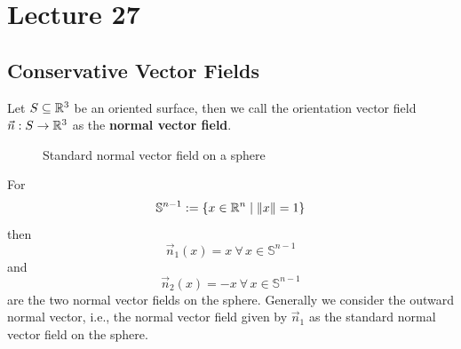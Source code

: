 \documentclass[../Analysis-3]{subfiles}
\begin{document}
\chapter*{Lecture 27} %
\setcounter{chapter}{27} %
\setcounter{section}{0}

\section{Conservative Vector Fields}

Let $S \subseteq \mathbb{R}^3$ be an oriented surface, then we call the orientation vector field $\vec{n} : S \to \mathbb{R}^3$ as the \textbf{normal vector field}.

\begin{Eg}{}{}
    \begin{figure}
        \centering
        \caption{Standard normal vector field on a sphere}\label{fig1:27}
    \end{figure}
    For
    \[
        \mathbb{S}^{n-1} := \{ x \in \mathbb{R}^n \mid \| x \| = 1 \}
    \]
    then
    \[
        \vec{n}_1(x) = x \ \forall \, x \in \mathbb{S}^{n-1}
    \]
    and
    \[
        \vec{n}_2(x) = -x \ \forall \, x \in \mathbb{S}^{n-1}
    \]
    are the two normal vector fields on the sphere. Generally we consider the outward normal vector, i.e., the normal vector field given by $\vec{n}_1$ as the standard normal vector field on the sphere.
\end{Eg}
\end{document}
